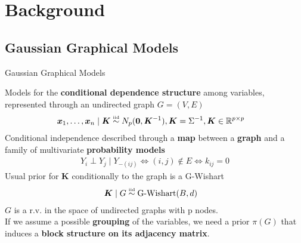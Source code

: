 

\section{Background}

\subsection{Gaussian Graphical Models}
\begin{frame}{Gaussian Graphical Models}

    Models for the \textbf{conditional dependence structure} among variables, represented through an undirected graph $G=(V,E)$
    \begin{align*}
    \bm{x}_{1}, \ldots, \bm{x}_{n} \mid \bm{K} &\iid N_{p}(\bm{0},\bm{K}^{-1}), \bm{K}=\Sigma^{-1}, \bm{K} \in \mathbb{R}^{p\times p}  %
    \end{align*}
Conditional independence described through a \textbf{map} between a \textbf{graph} and a family of multivariate \textbf{probability models}
\begin{align*}
Y_{i}\perp Y_{j} \mid Y_{-(ij)} \iff (i,j) \notin E \iff k_{ij}=0
\end{align*}
Usual prior for $\bm{K}$ conditionally to the graph is a G-Wishart
\begin{align*}
    \bm{K} \mid G &\overset{\text{\tiny{iid}}}{\sim} \text{G-Wishart}(B,d)
\end{align*}
$G$ is a r.v. in the space of undirected graphs with p nodes.\\
If we assume a possible \textbf{grouping} of the variables, we need a prior $\pi(G)$ that induces a \textbf{block structure on its adjacency matrix}.
\end{frame}



 

